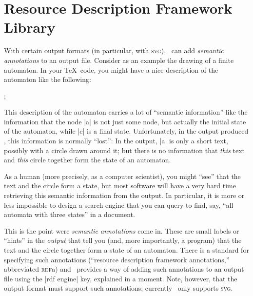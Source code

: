 %
%
%



\section{Resource Description Framework Library}

\label{section-library-rdf}
\label{section-tikz-rdf}

With certain output formats (in particular, with \textsc{svg}),
\tikzname\ can add \emph{semantic annotations} to an output
file. Consider as an example the drawing of a finite automaton. In your
\TeX\ code, you might have a nice description of the automaton like
the following:
\begin{codeexample}
\tikz[automaton] ;
\end{codeexample}
This description of the automaton carries a lot of ``semantic
information'' like the information that the node |a| is not just some
node, but actually the initial state of the automaton, while |c| is a
final state. Unfortunately, in the output produced \tikzname, this
information is normally ``lost'': In the output, |a| is only a short
text, possibly with a circle drawn around it; but there is no
information that \emph{this} text and \emph{this} circle together form
the state of an automaton.

As a human (more precisely, as a computer scientist), you might
``see'' that the text and the circle form a state, but most software
will have a very hard time retrieving this semantic information from the
output. In particular, it is more or less impossible to design a
search engine that you can query to find, say, ``all automata with
three states'' in a document.

This is the point were \emph{semantic annotations} come in. These are
small labels or ``hints'' in the \emph{output} that tell you (and,
more importantly, a program) that the text and the circle together
form a state of an automaton. There is a standard for specifying such
annotations (``resource description framework annotations,''
abbreviated \textsc{rdf}a) and \tikzname\ provides a way of
adding such annotations to an output file using the |rdf engine| key,
explained in a moment. Note, however, that the output format must
support such annotations; currently \tikzname\ only supports
\textsc{svg}.


